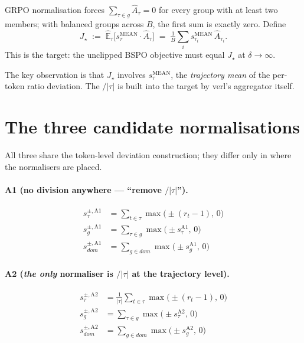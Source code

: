 \documentclass[11pt]{article}
\newcommand{\Ehat}{\widehat{\mathbb{E}}}
\newcommand{\smean}{s^{\text{MEAN}}}
\begin{document}
GRPO normalisation forces $\sum_{\tau\in g}\hat A_\tau = 0$ for every group
with at least two members; with balanced groups across $B$, the first sum
is exactly zero. Define
\[
\boxed{\quad J_\star \;:=\; \Ehat_\tau\bigl[\smean_\tau \cdot \hat A_\tau\bigr]
        \;=\; \tfrac{1}{B}\sum_i \smean_{\tau_i}\,\hat A_{\tau_i}. \quad}
\]
This is the target: the unclipped BSPO objective must equal $J_\star$ at
$\delta\to\infty$.

The key observation is that $J_\star$ involves $\smean_\tau$, the
\emph{trajectory mean} of the per-token ratio deviation. The $/|\tau|$ is
built into the target by verl's aggregator itself.

\section{The three candidate normalisations}

All three share the token-level deviation construction; they differ only
in where the normalisers are placed.

\paragraph{A1 (no division anywhere --- ``remove $/|\tau|$'').}
\begin{align*}
s_\tau^{\pm,\text{A1}}    &= \sum_{t\in\tau}\max\bigl(\pm(r_t-1),\,0\bigr) \\
s_g^{\pm,\text{A1}}       &= \sum_{\tau\in g}\max\bigl(\pm s_\tau^{\text{A1}},\,0\bigr) \\
s_{dom}^{\pm,\text{A1}}   &= \sum_{g\in dom}\max\bigl(\pm s_g^{\text{A1}},\,0\bigr)
\end{align*}

\paragraph{A2 (\textit{the only} normaliser is $/|\tau|$ at the trajectory level).}
\begin{align*}
s_\tau^{\pm,\text{A2}}    &= \frac{1}{|\tau|}\sum_{t\in\tau}\max\bigl(\pm(r_t-1),\,0\bigr) \\
s_g^{\pm,\text{A2}}       &= \sum_{\tau\in g}\max\bigl(\pm s_\tau^{\text{A2}},\,0\bigr) \\
s_{dom}^{\pm,\text{A2}}   &= \sum_{g\in dom}\max\bigl(\pm s_g^{\text{A2}},\,0\bigr)
\end{align*}
\end{document}
